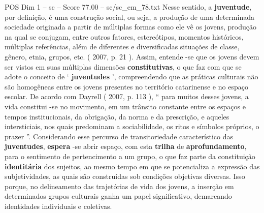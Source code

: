 \begin{textsample}{POS Dim 1 – sc – Score 77.00 – sc/sc\_em\_78.txt}
Nesse sentido, a \textbf{juventude}, por definição, é uma construção social, ou seja, a produção de uma determinada sociedade originada a partir de múltiplas formas como ele vê os jovens, produção na qual se conjugam, entre outros fatores, estereótipos, momentos históricos, múltiplas referências, além de diferentes e diversificadas situações de classe, gênero, etnia, grupos, etc. ( 2007, p. 21 ).
Assim, entende -se que os jovens devem ser vistos em suas múltiplas dimensões \textbf{constitutivas}, o que faz com que se adote o conceito de ‘ \textbf{juventudes} ’, compreendendo que as práticas culturais não são homogêneas entre os jovens presentes no território catarinense e no espaço escolar.
De acordo com Dayrell ( 2007, p. 113 ), “ para muitos desses jovens, a vida constitui -se no movimento, em um trânsito constante entre os espaços e tempos institucionais, da obrigação, da norma e da prescrição, e aqueles intersticiais, nos quais predominam a sociabilidade, os ritos e símbolos próprios, o prazer ”.
Considerando esse percurso de transitoriedade característico das \textbf{juventudes}, \textbf{espera} -se abrir espaço, com esta \textbf{trilha} de \textbf{aprofundamento}, para o sentimento de pertencimento a um grupo, o que faz parte da constituição \textbf{identitária} dos sujeitos, ao mesmo tempo em que se potencializa a expressão das subjetividades, as quais são construídas sob condições objetivas diversas.
Isso porque, no delineamento das trajetórias de vida dos jovens, a inserção em determinados grupos culturais ganha um papel significativo, demarcando identidades individuais e coletivas.

\end{textsample}
